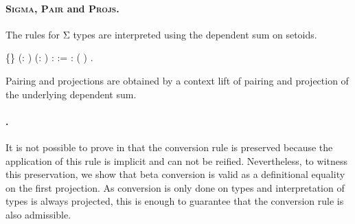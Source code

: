   \paragraph{\textsc{Sigma}, \textsc{Pair} and \textsc{Projs}.}
  The rules for Σ types are interpreted using the 
  dependent sum \coqdocvar{$\Sigma$} on setoids.  
\begin{coqdoccode}
\coqdocemptyline
\coqdocnoindent
{}  \{\} (: ) (: ) \coqdoceol
\coqdocindent{1.00em}
:   := \coqdocnotation{(} \coqdocvar{$\gamma$}: \coqdocnotation{[}\coqdocnotation{]}  ( \coqdocnotation{$\star$} \coqdocvariable{$\gamma$})\coqdocnotation{;}   \coqdocnotation{)}.\coqdoceol
\coqdocemptyline
\end{coqdoccode}
\noindent Pairing and projections are obtained
  by a context lift of pairing and projection of the underlying dependent sum.
\begin{coqdoccode}
\coqdocemptyline
\coqdocemptyline
\end{coqdoccode}
  \paragraph{.}


  It is not possible to prove in \Coq that the conversion rule is
  preserved because the application of this rule is implicit and
  can not be reified. Nevertheless, to witness this preservation, 
  we show that beta conversion is valid as a definitional equality
  on the first projection. As conversion is only done on 
  types and interpretation of types is always projected, this is 
  enough to guarantee that the conversion rule is also admissible.


